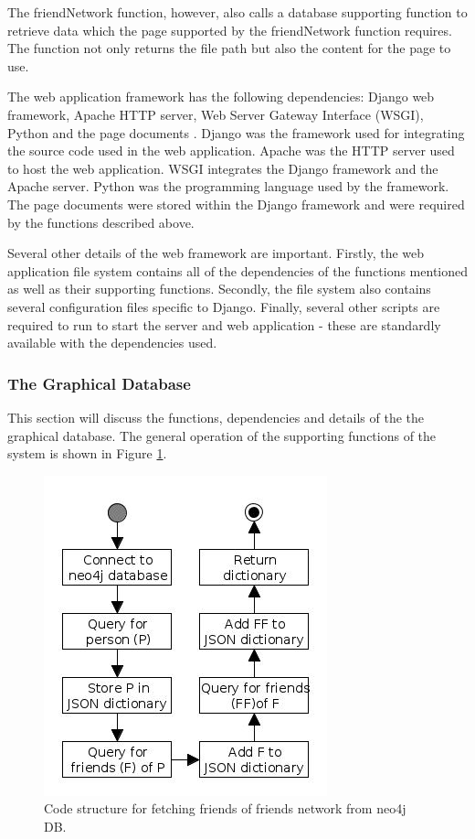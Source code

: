 \documentclass[12pt,onecolumn]{article}
\begin{document}
	The friendNetwork function, however, also calls a database supporting function to retrieve data which the page supported by the friendNetwork function requires. The function not only returns the file path but also the content for the page to use.
	
	The web application framework has the following dependencies: Django web framework, Apache HTTP server, Web Server Gateway Interface (WSGI), Python  and the page documents \cite{django, apache, wsgi}. Django was the framework used for integrating the source code used in the web application. Apache was the HTTP server used to host the web application. WSGI integrates the Django framework and the Apache server. Python was the programming language used by the framework. The page documents were stored within the Django framework and were required by the functions described above. 
	
	Several other details of the web framework are important. Firstly, the web application file system contains all of the dependencies of the functions mentioned as well as their supporting functions. Secondly, the file system also contains several configuration files specific to Django. Finally, several other scripts are required to run to start the server and web application - these are standardly available with the dependencies used.
	
	\subsubsection{The Graphical Database}
	This section will discuss the functions, dependencies and details of the the graphical database. The general operation of the supporting functions of the system is shown in Figure \ref{fig:db}.
	
		\begin{figure} [htb]
			\centering
			\includegraphics[scale=1]{neo4jdb}
			\caption{Code structure for fetching friends of friends network from neo4j DB.} \label{fig:db}
		\end{figure}
\end{document}
